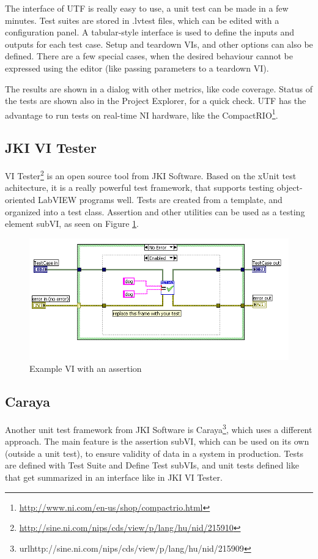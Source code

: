 The interface of UTF is really easy to use, a unit test can be made in a few minutes. Test suites are stored in .lvtest files, which can be edited with a configuration panel. A tabular-style interface is used to define the inputs and outputs for each test case. Setup and teardown VIs, and other options can also be defined. There are a few special cases, when the desired behaviour cannot be expressed using the editor (like passing parameters to a teardown VI).

The results are shown in a dialog with other metrics, like code coverage. Status of the tests are shown also in the Project Explorer, for a quick check. UTF has the advantage to run tests on real-time NI hardware, like the CompactRIO\footnote{\url{http://www.ni.com/en-us/shop/compactrio.html}}. \cite{labview_utf}
\subsection{JKI VI Tester}
VI Tester\footnote{\url{http://sine.ni.com/nips/cds/view/p/lang/hu/nid/215910}} is an open source tool from JKI Software. Based on the xUnit test achitecture, it is a really powerful test framework, that supports testing object-oriented LabVIEW programs well. Tests are created from a template, and organized into a test class. Assertion and other utilities can be used as a testing element subVI, as seen on Figure \ref{fig:vitester}. \cite{vitesterwiki}
\begin{figure}
\centering
\includegraphics[width=120mm,keepaspectratio]{figures/vitester.png}
\caption{Example VI with an assertion} 
\label{fig:vitester}
\end{figure}
\subsection{Caraya}
Another unit test framework from JKI Software is Caraya\footnote{url{http://sine.ni.com/nips/cds/view/p/lang/hu/nid/215909}}, which uses a different approach. The main feature is the assertion subVI, which can be used on its own (outside a unit test), to ensure validity of data in a system in production. Tests are defined with Test Suite and Define Test subVIs, and unit tests defined like that get summarized in an interface like in JKI VI Tester. \cite{carayapages}
